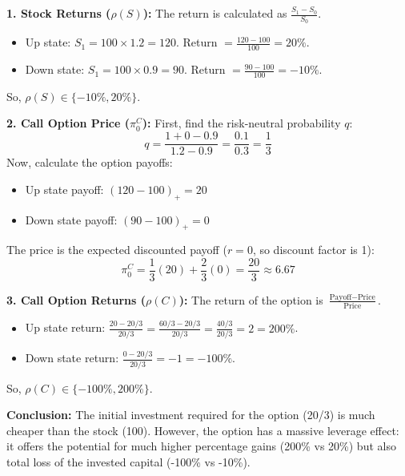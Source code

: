 \textbf{1. Stock Returns ($\rho(S)$):}
The return is calculated as $\frac{S_1 - S_0}{S_0}$.
\begin{itemize}
    \item Up state: $S_1 = 100 \times 1.2 = 120$. Return $= \frac{120 - 100}{100} = 20\%$.
    \item Down state: $S_1 = 100 \times 0.9 = 90$. Return $= \frac{90 - 100}{100} = -10\%$.
\end{itemize}
So, $\rho(S) \in \{-10\%, 20\%\}$.

\textbf{2. Call Option Price ($\pi_0^C$):}
First, find the risk-neutral probability $q$:
\begin{equation}
    q = \frac{1+0-0.9}{1.2-0.9} = \frac{0.1}{0.3} = \frac{1}{3}
\end{equation}
Now, calculate the option payoffs:
\begin{itemize}
    \item Up state payoff: $(120 - 100)_+ = 20$
    \item Down state payoff: $(90 - 100)_+ = 0$
\end{itemize}
The price is the expected discounted payoff ($r=0$, so discount factor is 1):
\begin{equation}
    \pi_0^C = \frac{1}{3}(20) + \frac{2}{3}(0) = \frac{20}{3} \approx 6.67
\end{equation}

\textbf{3. Call Option Returns ($\rho(C)$):}
The return of the option is $\frac{\text{Payoff} - \text{Price}}{\text{Price}}$.
\begin{itemize}
    \item Up state return: $\frac{20 - 20/3}{20/3} = \frac{60/3 - 20/3}{20/3} = \frac{40/3}{20/3} = 2 = 200\%$.
    \item Down state return: $\frac{0 - 20/3}{20/3} = -1 = -100\%$.
\end{itemize}
So, $\rho(C) \in \{-100\%, 200\%\}$.

\textbf{Conclusion:} The initial investment required for the option (20/3) is much cheaper than the stock (100). However, the option has a massive leverage effect: it offers the potential for much higher percentage gains (200\% vs 20\%) but also total loss of the invested capital (-100\% vs -10\%).